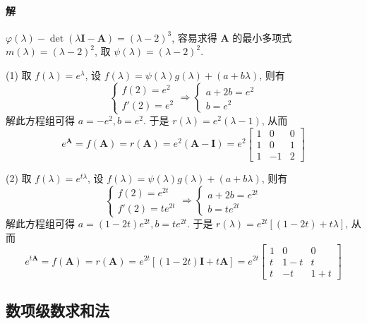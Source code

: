 \paragraph*{解} $\varphi(\lambda) - \det(\lambda \bm{I} - \bm{A}) = (\lambda - 2)^3$, 容易求得 $\bm{A}$ 的最小多项式 $m(\lambda) = (\lambda - 2)^2$, 取 $\psi(\lambda) =
(\lambda - 2)^2$.
\par (1) 取 $f(\lambda) = e^\lambda$, 设 $f(\lambda) = \psi(\lambda)g(\lambda) + (a + b\lambda)$, 则有
\begin{equation*}
    \begin{cases}
        f(2) = e^2 \\
        f'(2) = e^2
    \end{cases} \Rightarrow
    \begin{cases}
        a + 2b = e^2 \\
        b = e^2
    \end{cases}
\end{equation*}
解此方程组可得 $a = -e^2, b = e^2$. 于是 $r(\lambda) = e^2(\lambda - 1)$, 从而
$$
    e^{\bm{A}} = f(\bm{A}) = r(\bm{A}) = e^2(\bm{A} - \bm{I}) = e^2\begin{bmatrix}
        1 & 0  & 0 \\
        1 & 0  & 1 \\
        1 & -1 & 2
    \end{bmatrix}
$$
\par (2) 取 $f(\lambda) = e^{t\lambda}$, 设 $f(\lambda) = \psi(\lambda)g(\lambda) + (a + b\lambda)$, 则有
$$
    \begin{cases}
        f(2) = e^{2t} \\
        f'(2) = te^{2t}
    \end{cases} \Rightarrow
    \begin{cases}
        a + 2b = e^{2t} \\
        b = te^{2t}
    \end{cases}
$$
解此方程组可得 $a = (1 - 2t)e^{2t}, b = te^{2t}$. 于是 $r(\lambda) = e^{2t}[(1 - 2t) + t\lambda]$, 从而
$$
    e^{t\bm{A}} = f(\bm{A}) = r(\bm{A}) = e^{2t}[(1 - 2t)\bm{I} + t\bm{A}] = e^{2t} \begin{bmatrix}
        1 & 0   & 0     \\
        t & 1-t & t     \\
        t & -t  & 1 + t
    \end{bmatrix}
$$

\subsection{数项级数求和法}

